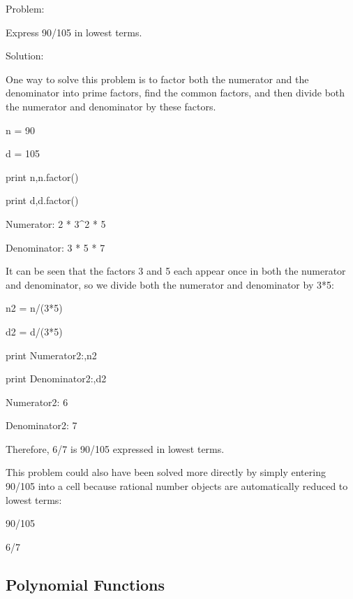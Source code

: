 \documentclass[12pt,oneside]{book}
\begin{document}
{\textquotedbl}{\textquotedbl}{\textquotedbl}

Problem:

Express 90/105 in lowest terms.


Solution:

One way to solve this problem is to factor both the numerator and the denominator into prime factors, find the common factors, and then divide both the numerator and denominator by these factors.

{\textquotedbl}{\textquotedbl}{\textquotedbl}

n = 90

d = 105

print n,n.factor()

print d,d.factor()

{\textbar}

Numerator: 2 * 3\^{}2 * 5

Denominator: 3 * 5 * 7


{\textquotedbl}{\textquotedbl}{\textquotedbl}

It can be seen that the factors 3 and 5 each appear once in both the numerator and denominator, so we divide both the numerator and denominator by 3*5:

{\textquotedbl}{\textquotedbl}{\textquotedbl}

n2 = n/(3*5)

d2 = d/(3*5)

print {\textquotedbl}Numerator2:{\textquotedbl},n2

print {\textquotedbl}Denominator2:{\textquotedbl},d2

{\textbar}

Numerator2: 6

Denominator2: 7


{\textquotedbl}{\textquotedbl}{\textquotedbl}

Therefore, 6/7 is 90/105 expressed in lowest terms.


This problem could also have been solved more directly by simply entering 90/105 into a cell because rational number objects are automatically reduced to lowest terms:

{\textquotedbl}{\textquotedbl}{\textquotedbl}

90/105

{\textbar}

6/7

\subsection[Polynomial Functions]{Polynomial Functions}
\end{document}
